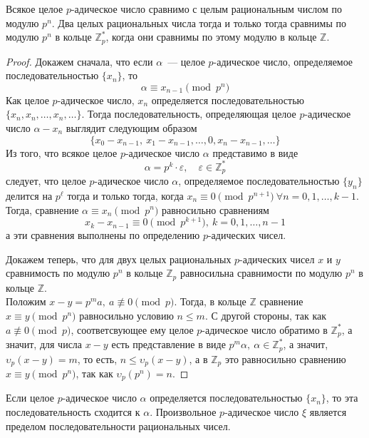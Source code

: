 \documentclass[11pt]{report}
\begin{document}
    \begin{theorem}
        Всякое целое $p$-адическое число сравнимо с целым рациональным числом по модулю $p^n$. Два целых рациональных числа тогда и только тогда сравнимы по модулю
        $p^n$ в кольце $\mathbb{Z}_p^{*}$, когда они сравнимы по этому модулю в кольце $\mathbb{Z}$.
    \end{theorem}
    \begin{proof}
        Докажем сначала, что если $\alpha$~--- целое $p$-адическое число, определяемое последовательностью $\{ x_n \}$, то
        \[ \alpha \equiv x_{n - 1} \pmod{p^n} \]
        Как целое $p$-адическое число, $x_n$  определяется последовательностью $\{ x_n, x_n, \ldots, x_n, \ldots \}$. Тогда последовательность, определяющая целое $p$-адическое число
        $\alpha - x_n$ выглядит следующим образом
        \[ \{ x_0 - x_{n - 1}, \ x_1 - x_{n - 1}, \ldots, 0, x_n - x_{n - 1}, \ldots \}\]
        Из того, что всякое целое $p$-адическое число $\alpha$ представимо в виде
        \[ \alpha = p^k \cdot \varepsilon, \quad \varepsilon \in \mathbb{Z}_p^{*}\]
        следует, что целое $p$-адическое число $\alpha$, определяемое последовательностью $\{ y_n \}$ делится на $p^{\ell}$ тогда и только тогда, когда
        $x_n \equiv 0 \pmod{p^{n + 1}} \  \forall n = 0, 1, \ldots, k - 1$.
        Тогда, сравнение  $\alpha \equiv x_n \pmod{p^n}$ равносильно сравнениям
        \[ x_k - x_{n - 1} \equiv 0 \pmod{p^{k + 1}}, \ k = 0, 1, \ldots, n - 1\]
        а эти сравнения выполнены по определению $p$-адических чисел.

        Докажем теперь, что для двух целых рациональных $p$-адических чисел $x$ и $y$ сравнимость по модулю $p^n$ в кольце $\mathbb{Z}_p$ равносильна
        сравнимости по модулю $p^n$ в кольце $\mathbb{Z}$.\\
        Положим $x - y = p^m a, \ a \not\equiv 0 \pmod{p} $. Тогда, в кольце $\mathbb{Z}$ сравнение $x \equiv y \pmod{p^n}$ равносильно условию $n \le m$.
        С другой стороны, так как $a \not\equiv 0 \pmod{p}$, соответсвующее ему целое $p$-адическое число обратимо в $\mathbb{Z}_p^{*}$, а значит, для числа
        $x - y$ есть представление в виде $p^m \alpha, \ \alpha \in \mathbb{Z}_p^{*}$, а значит, $ \upsilon_p{(x - y)} = m$, то есть, $n \le \upsilon_p{(x - y)}$,
        а в $\mathbb{Z}_p$ это равносильно сравнению $x \equiv y \pmod{p^n}$, так как $ \upsilon_p{(p^n)} = n$.
    \end{proof}
    \begin{theorem}
        Если целое $p$-адическое число $\alpha$ определяется последовательностью $\{ x_n \}$, то эта последовательность сходится к $\alpha$. Произвольное $p$-адическое число
        $\xi$ является пределом последовательности рациональных чисел.
    \end{theorem}
\end{document}
